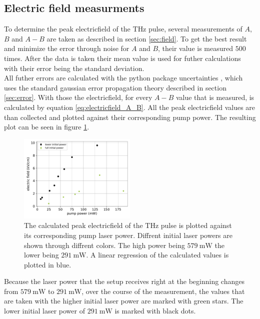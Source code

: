 \subsection{Electric field measurments}
\label{sec:znte_electricfield}
\FloatBarrier
To determine the peak electricfield of the $\si{\tera\hertz}$ pulse, several measurements of $A$, $B$ and $A-B$ are taken as described in section \ref{sec:field}.
To get the best result and minimize the error through noise for $A$ and $B$, their value is measured $500$ times.
After the data is taken their mean value is used for futher calculations with their error being the standard deviation.
\\
All futher errors are calculated with the python package uncertainties \cite{uncertainties}, which uses the standard gaussian error propagation theory described in section \ref{sec:error}.
With those the electricfield, for every $A-B$ value that is measured, is calculated by equation \ref{eq:electricfield_A_B}.
All the peak electricfield values are than collected and plotted against their corresponding pump power.
The resulting plot can be seen in figure \ref{fig:znte_electricfield}.
\\
\begin{figure}
    \centering
    \includegraphics[width=0.5\textwidth]{Plots/eltric_field_ZnTe.pdf}
    \caption{The calculated peak electricfield of the $\si{\tera\hertz}$ pulse is plotted against its corresponding pump laser power.
    Diffrent initial laser powers are shown through diffrent colors. The high power being $\SI{579}{\milli\W}$ the lower being $\SI{291}{\milli\W}$.
    A linear regression of the calculated values is plotted in blue.}
    \label{fig:znte_electricfield}
\end{figure}
Because the laser power that the setup receives right at the beginning changes from $\SI{579}{\milli\W}$ to $\SI{291}{\milli\W}$, over the course of the measurement, the values that are taken with the higher initial laser power are marked with green stars.
The lower initial laser power of $\SI{291}{\milli\W}$ is marked with black dots.
